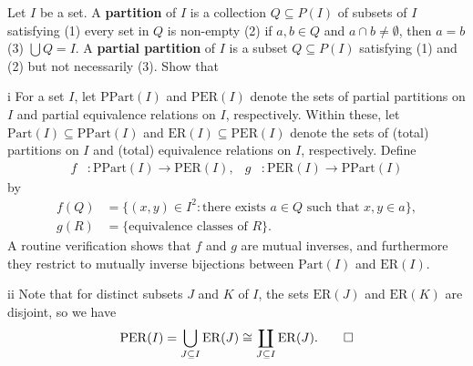 \begin{exercise}
Let \(I\) be a set.
A \textbf{partition} of \(I\) is a collection \(Q \subseteq P(I)\) of subsets of \(I\) satisfying (1) every set in \(Q\) is non-empty (2) if \(a, b \in Q\) and \(a \cap b \neq \emptyset\), then \(a = b\) (3) \(\bigcup Q = I\).
A \textbf{partial partition} of \(I\) is a subset \(Q \subseteq P(I)\) satisfying (1) and (2) but not necessarily (3).
Show that
\end{exercise}

\begin{partsolution}{i}
For a set \(I\), let \(\mathrm{PPart}(I)\) and \(\mathrm{PER}(I)\) denote the sets of partial partitions on \(I\) and partial equivalence relations on \(I\), respectively.
Within these, let \(\mathrm{Part}(I) \subseteq \mathrm{PPart}(I)\) and \(\mathrm{ER}(I) \subseteq \mathrm{PER}(I)\) denote the sets of (total) partitions on \(I\) and (total) equivalence relations on \(I\), respectively.
Define
\begin{align*}
f &: \mathrm{PPart}(I) \to \mathrm{PER}(I), &
g &: \mathrm{PER}(I) \to \mathrm{PPart}(I)
\end{align*}
by
\begin{align*}
f(Q) &= \big\{(x, y) \in I^2 : \text{there exists \(a \in Q\) such that \(x, y \in a\)}\big\}, \\
g(R) &= \big\{\text{equivalence classes of \(R\)}\big\}.
\end{align*}
A routine verification shows that \(f\) and \(g\) are mutual inverses, and furthermore they restrict to mutually inverse bijections between \(\mathrm{Part}(I)\) and \(\mathrm{ER}(I)\).
\end{partsolution}

\begin{partsolution}{ii}
Note that for distinct subsets \(J\) and \(K\) of \(I\), the sets \(\mathrm{ER}(J)\) and \(\mathrm{ER}(K)\) are disjoint, so we have
\begin{equation*}
\mathrm{PER}(I)
= \bigcup_{J \subseteq I} \mathrm{ER}(J)
\cong \coprod_{J \subseteq I} \mathrm{ER}(J).
\qedhere
\end{equation*}
\end{partsolution}